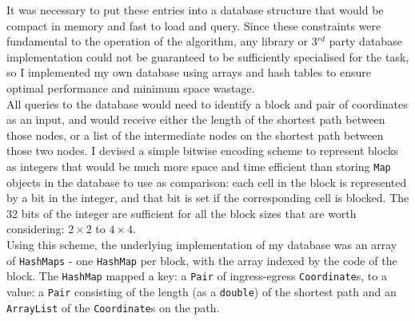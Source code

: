 \documentclass[12pt,notitlepage]{report}
\begin{document}
\noindent
It was necessary to put these entries into a database structure that would be compact in memory and fast to load and query. Since these constraints were fundamental to the operation of the algorithm, any library or 3$^{rd}$ party database implementation could not be guaranteed to be sufficiently specialised for the task, so I implemented my own database using arrays and hash tables to ensure optimal performance and minimum space wastage.\\

\noindent
All queries to the database would need to identify a block and pair of coordinates as an input, and would receive either the length of the shortest path between those nodes, or a list of the intermediate nodes on the shortest path between those two nodes. I devised a simple bitwise encoding scheme to represent blocks as integers that would be much more space and time efficient than storing {\tt Map} objects in the database to use as comparison: each cell in the block is represented by a bit in the integer, and that bit is set if the corresponding cell is blocked. The 32 bits of the integer are sufficient for all the block sizes that are worth considering: $2 \times 2$ to $4 \times 4$.\footnotemark[1]\\

\noindent
Using this scheme, the underlying implementation of my database was an array of {\tt  HashMaps} - one {\tt HashMap} per block, with the array indexed by the code of the block. The {\tt HashMap} mapped a key: a {\tt Pair} of ingress-egress {\tt Coordinate}s, to a value: a {\tt Pair} consisting of the length (as a {\tt double}) of the shortest path and an {\tt ArrayList} of the {\tt Coordinate}s on the path.\\
\end{document}

